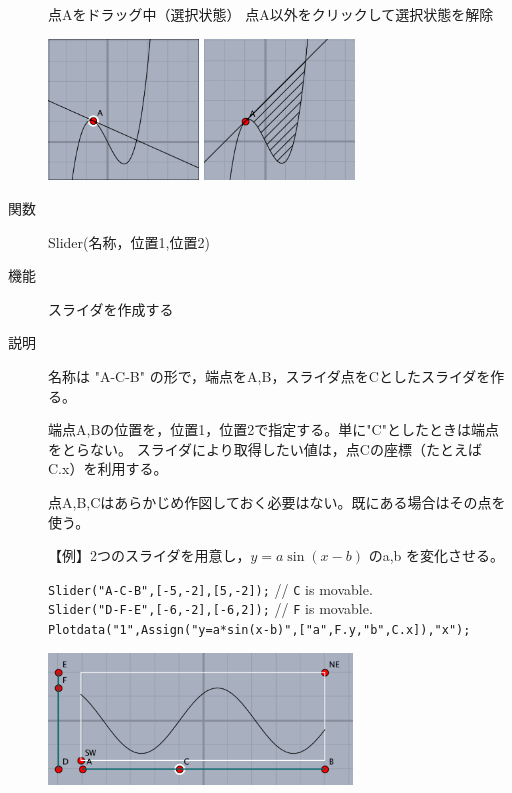 \documentclass[papersize,a4paper,12pt,uplatex]{jsarticle}
\begin{document}
\begin{description}
\vspace{\baselineskip}
\hspace{5mm} 点Aをドラッグ中（選択状態）\hspace{5mm} 点A以外をクリックして選択状態を解除

\hspace{10mm}\includegraphics[bb=0.00 0.00 218.01 204.51,width=40mm]{Fig/ptselected01.pdf} 
\hspace{10mm}\includegraphics[bb=0.00 0.00 219.01 204.51,width=40mm]{Fig/ptselected02.pdf} 

\vspace{\baselineskip}
\hypertarget{slider}{}
\item[関数]Slider(名称，位置1,位置2)
\item[機能]スライダを作成する
\item[説明]名称は "A-C-B" の形で，端点をA,B，スライダ点をCとしたスライダを作る。

端点A,Bの位置を，位置1，位置2で指定する。単に"C"としたときは端点をとらない。
スライダにより取得したい値は，点Cの座標（たとえば C.x）を利用する。

点A,B,Cはあらかじめ作図しておく必要はない。既にある場合はその点を使う。

\vspace{\baselineskip}
【例】2つのスライダを用意し，$y=a\sin(x-b)$ のa,b を変化させる。

\verb|Slider("A-C-B",[-5,-2],[5,-2]);| // \verb|C| is movable.\\
\verb|Slider("D-F-E",[-6,-2],[-6,2]);| // \verb|F| is movable.\\
\verb|Plotdata("1",Assign("y=a*sin(x-b)",["a",F.y,"b",C.x]),"x"); |

\vspace{2mm}
\hspace{15mm}
\includegraphics[bb=0.00 0.00 445.02 193.01,height=35mm]{Fig/slider.pdf} 


\end{description}
\end{document}
